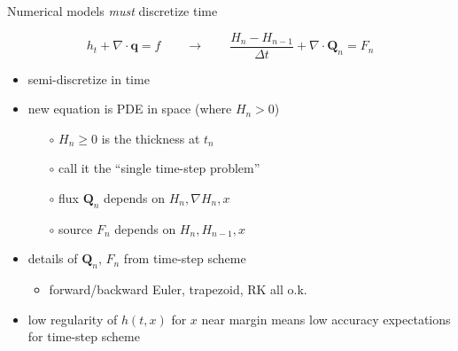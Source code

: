 \documentclass{beamer}
\newcommand\bq{\mathbf{q}}
\newcommand\bQ{\mathbf{Q}}
\newcommand{\Div}{\nabla\cdot}
\newcommand{\grad}{\nabla}
\begin{document}
\begin{frame}{Numerical models \emph{must} discretize time}

$$h_t + \Div\bq = f \qquad \to \qquad \frac{H_n - H_{n-1}}{\Delta t} + \Div \bQ_n = F_n$$

  \begin{itemize}
  \item semi-discretize in time
  \item new equation is PDE in space (where $H_n>0$)
    \begin{itemize}
    \item[$\circ$] $H_n\ge 0$ is the thickness at $t_n$
    \item[$\circ$] call it the ``single time-step problem''
    \item[$\circ$] flux $\bQ_n$ depends on $H_n,\grad H_n,x$
    \item[$\circ$] source $F_n$ depends on $H_n,H_{n-1},x$
    \end{itemize}
  \item<2-> details of $\bQ_n$, $F_n$ from time-step scheme
    \begin{itemize}
    \item<2->[$\circ$] forward/backward Euler, trapezoid, RK all o.k.
    \end{itemize}
  \item<3> low regularity of $h(t,x)$ for $x$ near margin means low accuracy expectations for time-step scheme
  \end{itemize}
\end{frame}
\end{document}
